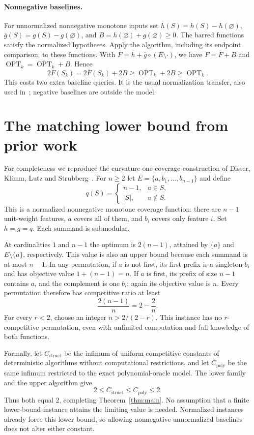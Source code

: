 \documentclass[acmsmall,screen,nonacm,11pt,natbib=false]{acmart}
\newcommand{\OPT}{\operatorname{OPT}}
\begin{document}
\paragraph{Nonnegative baselines.}
For unnormalized nonnegative monotone inputs set
$\bar h(S)=h(S)-h(\varnothing)$,
$\bar g(S)=g(S)-g(\varnothing)$, and
$B=h(\varnothing)+g(\varnothing)\ge0$.
The barred functions satisfy the normalized hypotheses. Apply the algorithm,
including its endpoint comparison, to these functions. With
$\bar F=\bar h+\bar g\circ(E\setminus\cdot)$, we have
$F=\bar F+B$ and $\OPT_k=\overline{\OPT}_k+B$. Hence
\[
 2F(S_k)=2\bar F(S_k)+2B
 \ge\overline{\OPT}_k+2B\ge\OPT_k.
\]
This costs two extra baseline queries. It is the usual normalization transfer,
also used in~\cite[Eq.~(5)]{DKLS26}; negative baselines are outside the model.

\section{The matching lower bound from prior work}\label{sec:lower}

For completeness we reproduce the curvature-one coverage construction of
Disser, Klimm, Lutz and Strubberg~\cite[Proposition~11]{DKLS26}.
For $n\ge2$ let $E=\{a,b_1,\ldots,b_{n-1}\}$ and define
\[
 q(S)=\begin{cases}
 n-1,&a\in S,\\
 |S|,&a\notin S.
 \end{cases}
\]
This is a normalized nonnegative monotone coverage function: there are $n-1$
unit-weight features, $a$ covers all of them, and $b_i$ covers only feature
$i$. Set $h=g=q$. Each summand is submodular.

At cardinalities $1$ and $n-1$ the optimum is $2(n-1)$, attained by
$\{a\}$ and $E\setminus\{a\}$, respectively. This value is also an upper
bound because each summand is at most $n-1$. In any permutation, if $a$
is not first, its first prefix is a singleton $b_i$ and has objective value
$1+(n-1)=n$. If $a$ is first, its prefix of size $n-1$ contains $a$, and
the complement is one $b_i$; again its objective value is $n$.
Every permutation therefore has competitive ratio at least
\[
 \frac{2(n-1)}{n}=2-\frac2n.
\]
For every $r<2$, choose an integer $n>2/(2-r)$. This instance has no
$r$-competitive permutation, even with unlimited computation and full
knowledge of both functions.

Formally, let $C_{\mathrm{struct}}$ be the infimum of uniform competitive
constants of deterministic algorithms without computational restrictions,
and let $C_{\mathrm{poly}}$ be the same infimum restricted to the exact
polynomial-oracle model. The lower family and the upper algorithm give
\[
 2\le C_{\mathrm{struct}}\le C_{\mathrm{poly}}\le2.
\]
Thus both equal $2$, completing Theorem~\ref{thm:main}. No assumption that
a finite lower-bound instance attains the limiting value is needed.
Normalized instances already force this lower bound, so allowing nonnegative
unnormalized baselines does not alter either constant.
\end{document}
